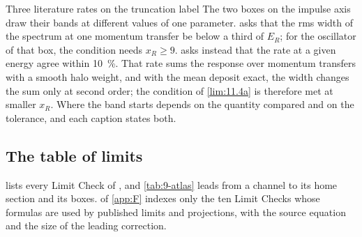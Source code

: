 \begin{workedexample}{Three literature rates on the truncation label}
The two boxes on the impulse axis draw their bands at different values of one parameter.  asks that the rms width of the spectrum at one momentum transfer be below a third of $E_R$; for the oscillator of that box, the condition needs $x_R \ge 9$.  asks instead that the rate at a given energy agree within \SI{10}{\percent}. That rate sums the response over momentum transfers with a smooth halo weight, and with the mean deposit exact, the width changes the sum only at second order; the condition of \cref{lim:11.4a} is therefore met at smaller $x_R$. Where the band starts depends on the quantity compared and on the tolerance, and each caption states both.
\end{workedexample}

\subsection{The table of limits}\label{sec:9.4-appF}

 lists every Limit Check of , and \cref{tab:9-atlas} leads from a channel to its home section and its boxes.  of \cref{app:F} indexes only the ten Limit Checks whose formulas are used by published limits and projections, with the source equation and the size of the leading correction.


